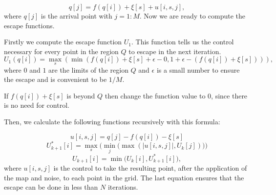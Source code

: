 \begin{equation}
    q[j] = f(q[i]) +\xi[s] +u[i,s,j],
\end{equation}
where $q[j]$ is the arrival point with $j=1:M$. Now we are ready to compute the escape functions.

Firstly we compute the escape function $U_1$. This function tells us the control necessary for every point in the region $Q$ to escape in the next iteration. 
\begin{equation}
U_1(q[i]) = \max\limits_{s}(\min(f(q[i]) + \xi[s] + \epsilon - 0, 1 + \epsilon - (f(q[i]) + \xi[s]))),
\end{equation}
where $0$ and $1$ are the limits of the region $Q$ and $\epsilon$ is a small number to ensure the escape and is convenient to be $1/M$.

If $f(q[i]) + \xi[s]$ is beyond $Q$ then change the function value to $0$, since there is no need for control.

Then, we calculate the following functions recursively with this formula:

\begin{equation*}
u[i,s,j] = q[j] - f(q[i]) - \xi[s]
\end{equation*}
\begin{equation*}
U^{*}_{k+1}[i]=\max_s\Big(\min_j\big(\max(|u[i,s,j]|,U_k[j])\big)\Big)
\end{equation*}
\begin{equation}
U_{k+1}[i]=\min\bigg(U_k[i],U^{*}_{k+1}[i]\bigg),
\label{equ:QuickEscapeFunctions}
\end{equation}
where $u[i,s,j]$ is the control to take the resulting point, after the application of the map and noise, to each point in the grid. The last equation ensures that the escape can be done in less than $N$ iterations.

